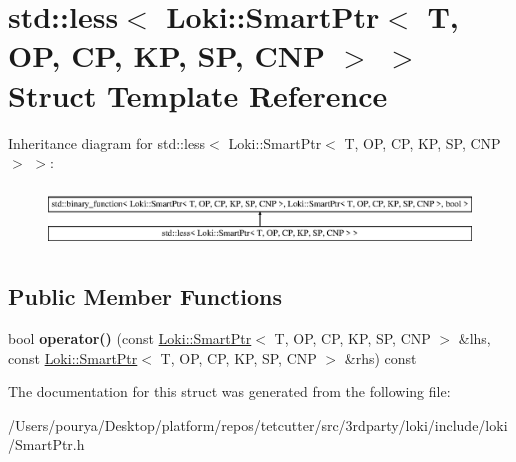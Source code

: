\hypertarget{structstd_1_1less_3_01Loki_1_1SmartPtr_3_01T_00_01OP_00_01CP_00_01KP_00_01SP_00_01CNP_01_4_01_4}{}\section{std\+:\+:less$<$ Loki\+:\+:Smart\+Ptr$<$ T, O\+P, C\+P, K\+P, S\+P, C\+N\+P $>$ $>$ Struct Template Reference}
\label{structstd_1_1less_3_01Loki_1_1SmartPtr_3_01T_00_01OP_00_01CP_00_01KP_00_01SP_00_01CNP_01_4_01_4}
Inheritance diagram for std\+:\+:less$<$ Loki\+:\+:Smart\+Ptr$<$ T, O\+P, C\+P, K\+P, S\+P, C\+N\+P $>$ $>$\+:\begin{figure}[H]
\begin{center}
\leavevmode
\includegraphics[height=1.627907cm]{structstd_1_1less_3_01Loki_1_1SmartPtr_3_01T_00_01OP_00_01CP_00_01KP_00_01SP_00_01CNP_01_4_01_4}
\end{center}
\end{figure}
\subsection*{Public Member Functions}
\begin{DoxyCompactItemize}
\item 
\hypertarget{structstd_1_1less_3_01Loki_1_1SmartPtr_3_01T_00_01OP_00_01CP_00_01KP_00_01SP_00_01CNP_01_4_01_4_afa99f3f660c0514b917b199540c27e9e}{}bool {\bfseries operator()} (const \hyperlink{classLoki_1_1SmartPtr}{Loki\+::\+Smart\+Ptr}$<$ T, O\+P, C\+P, K\+P, S\+P, C\+N\+P $>$ \&lhs, const \hyperlink{classLoki_1_1SmartPtr}{Loki\+::\+Smart\+Ptr}$<$ T, O\+P, C\+P, K\+P, S\+P, C\+N\+P $>$ \&rhs) const \label{structstd_1_1less_3_01Loki_1_1SmartPtr_3_01T_00_01OP_00_01CP_00_01KP_00_01SP_00_01CNP_01_4_01_4_afa99f3f660c0514b917b199540c27e9e}

\end{DoxyCompactItemize}


The documentation for this struct was generated from the following file\+:\begin{DoxyCompactItemize}
\item 
/\+Users/pourya/\+Desktop/platform/repos/tetcutter/src/3rdparty/loki/include/loki/Smart\+Ptr.\+h\end{DoxyCompactItemize}
